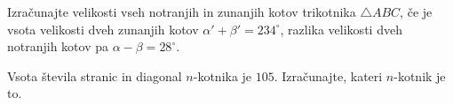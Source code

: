 \documentclass[addpoints]{exam}
\begin{document}
\begin{questions}


    \question[5]
        Izračunajte velikosti vseh notranjih in zunanjih kotov trikotnika $\triangle ABC$, 
        če je vsota velikosti dveh zunanjih kotov $\alpha'+\beta'=234^\circ$, razlika velikosti dveh notranjih kotov pa $\alpha-\beta=28^\circ$.








    \question[3]
        Vsota števila stranic in diagonal $n$-kotnika je $105$. Izračunajte, kateri $n$-kotnik je to.




\end{questions}
\end{document}
